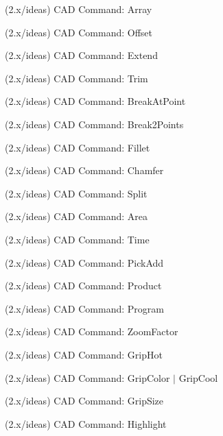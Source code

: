 \begin{DoxyRefList}
\label{todo__todo000291}%
%
(2.\+x/ideas) CAD Command\+: Array

\label{todo__todo000292}%
%
(2.\+x/ideas) CAD Command\+: Offset

\label{todo__todo000293}%
%
(2.\+x/ideas) CAD Command\+: Extend

\label{todo__todo000294}%
%
(2.\+x/ideas) CAD Command\+: Trim

\label{todo__todo000295}%
%
(2.\+x/ideas) CAD Command\+: Break\+At\+Point

\label{todo__todo000296}%
%
(2.\+x/ideas) CAD Command\+: Break2\+Points

\label{todo__todo000297}%
%
(2.\+x/ideas) CAD Command\+: Fillet

\label{todo__todo000298}%
%
(2.\+x/ideas) CAD Command\+: Chamfer

\label{todo__todo000299}%
%
(2.\+x/ideas) CAD Command\+: Split

\label{todo__todo000300}%
%
(2.\+x/ideas) CAD Command\+: Area

\label{todo__todo000301}%
%
(2.\+x/ideas) CAD Command\+: Time

\label{todo__todo000302}%
%
(2.\+x/ideas) CAD Command\+: Pick\+Add

\label{todo__todo000303}%
%
(2.\+x/ideas) CAD Command\+: Product

\label{todo__todo000304}%
%
(2.\+x/ideas) CAD Command\+: Program

\label{todo__todo000305}%
%
(2.\+x/ideas) CAD Command\+: Zoom\+Factor

\label{todo__todo000306}%
%
(2.\+x/ideas) CAD Command\+: Grip\+Hot

\label{todo__todo000307}%
%
(2.\+x/ideas) CAD Command\+: Grip\+Color $|$ Grip\+Cool

\label{todo__todo000308}%
%
(2.\+x/ideas) CAD Command\+: Grip\+Size

\label{todo__todo000309}%
%
(2.\+x/ideas) CAD Command\+: Highlight


\end{DoxyRefList}
